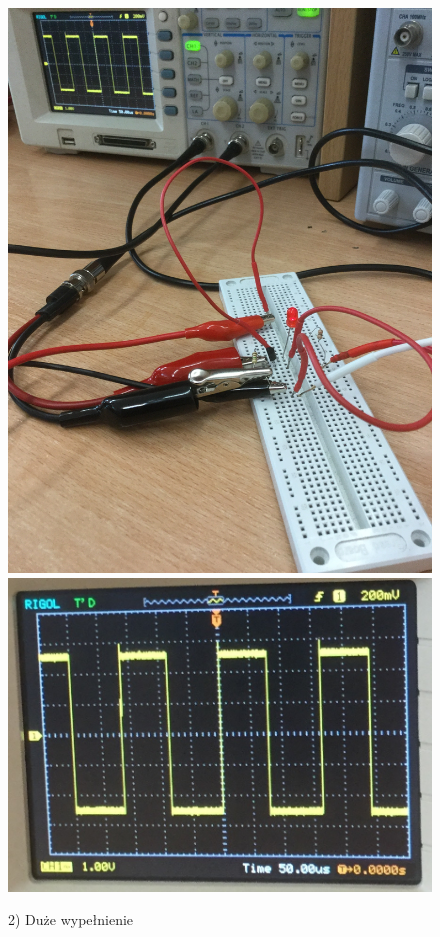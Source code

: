 \documentclass[polish,a4paper]{article}
\begin{document}
\begin{figure}
\caption{2) Duże wypełnienie}
\includegraphics[scale=0.05]{duze}
\includegraphics[scale=0.30]{duzeOsc}
\end{figure}
\end{document}
